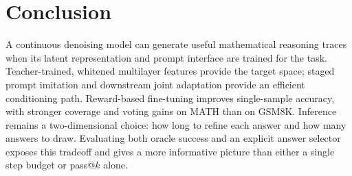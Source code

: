 \section{Conclusion}
A continuous denoising model can generate useful mathematical reasoning traces when its latent representation and prompt interface are trained for the task. Teacher-trained, whitened multilayer features provide the target space; staged prompt imitation and downstream joint adaptation provide an efficient conditioning path. Reward-based fine-tuning improves single-sample accuracy, with stronger coverage and voting gains on MATH than on GSM8K. Inference remains a two-dimensional choice: how long to refine each answer and how many answers to draw. Evaluating both oracle success and an explicit answer selector exposes this tradeoff and gives a more informative picture than either a single step budget or pass@$k$ alone.
